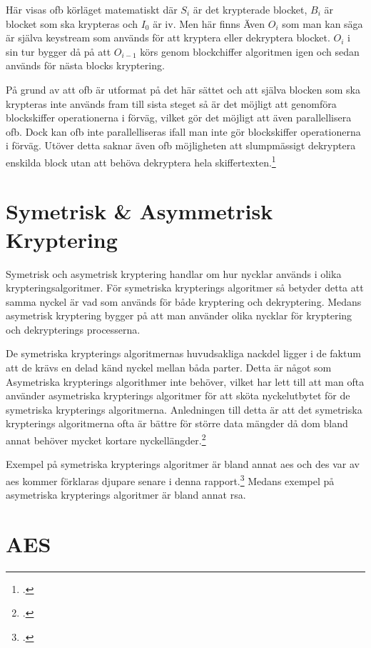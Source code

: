 Här visas \acrshort{ofb} körläget matematiskt där $S_i$ är det krypterade blocket,
$B_i$ är blocket som ska krypteras och $I_0$ är \acrshort{iv}. Men här finns Även
$O_i$ som man kan säga är själva \gls{keystream} som används för att kryptera eller
dekryptera blocket. $O_i$ i sin tur bygger då på att $O_{i-1}$ körs genom blockchiffer
algoritmen igen och sedan används för nästa blocks kryptering.

På grund av att \acrshort{ofb} är utformat på det här sättet och att själva blocken som
ska krypteras inte används fram till sista steget så är det möjligt att genomföra blockskiffer
operationerna i förväg, vilket gör det möjligt att även parallellisera \acrshort{ofb}. Dock
kan \acrshort{ofb} inte parallelliseras ifall man inte gör blockskiffer operationerna
i förväg. Utöver detta saknar även \acrshort{ofb} möjligheten att slumpmässigt dekryptera
enskilda block utan att behöva dekryptera hela skiffertexten.\footcite{modesofoperation}

\section{Symetrisk \& Asymmetrisk Kryptering}
\label{sec:symmetric-asymmetric-encryption}
Symetrisk och asymetrisk kryptering handlar om hur nycklar används i olika
krypteringsalgoritmer. För symetriska krypterings algoritmer så betyder detta
att samma nyckel är vad som används för både kryptering och dekryptering. Medans
asymetrisk kryptering bygger på att man använder olika nycklar för kryptering och
dekrypterings processerna.

De symetriska krypterings algoritmernas huvudsakliga nackdel ligger i de faktum att
de krävs en delad känd nyckel mellan båda parter. Detta är något som Asymetriska
krypterings algorithmer inte behöver, vilket har lett till att man ofta använder
asymetriska krypterings algoritmer för att sköta nyckelutbytet för de symetriska
krypterings algoritmerna. Anledningen till detta är att det symetriska krypterings
algoritmerna ofta är bättre för större data mängder då dom bland annat behöver mycket
kortare nyckellängder.\footcite{symencrypt}

Exempel på symetriska krypterings algoritmer är bland annat \acrshort{aes} och
\acrshort{des} var av \acrshort{aes} kommer förklaras djupare senare i denna rapport.\footcite{symencrypt}
Medans exempel på asymetriska krypterings algoritmer är bland annat \gls{rsa}.

\section{AES}

